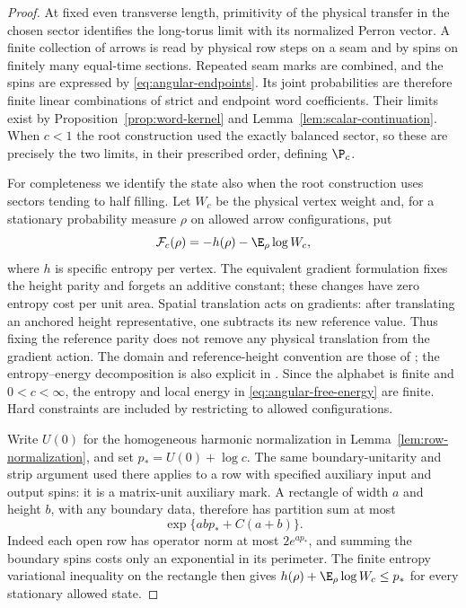 \begin{proof}
At fixed even transverse length, primitivity of the physical transfer
in the chosen sector identifies the long-torus limit with its normalized
Perron vector.  A finite collection of arrows is read by physical row
steps on a seam and by spins on finitely many equal-time sections.
Repeated seam marks are combined, and the spins are expressed by
\eqref{eq:angular-endpoints}.  Its joint probabilities are therefore
finite linear combinations of strict and endpoint word coefficients.
Their limits exist by Proposition~\ref{prop:word-kernel} and
Lemma~\ref{lem:scalar-continuation}.  When $c<1$ the root construction
used the exactly balanced sector, so these are precisely the two limits,
in their prescribed order, defining $\P_c$.

For completeness we identify the state also when the root construction
uses sectors tending to half filling.  Let $W_c$ be the physical vertex
weight and, for a stationary probability measure $\rho$ on allowed
arrow configurations, put
\begin{equation}\label{eq:angular-free-energy}
 \mathcal F_c(\rho)=-h(\rho)-\E_\rho\log W_c,
\end{equation}
where $h$ is specific entropy per vertex.  The equivalent gradient
formulation fixes the height parity and forgets an additive constant;
these changes have zero entropy cost per unit area.  Spatial translation
acts on gradients: after translating an anchored height representative,
one subtracts its new reference value.  Thus fixing the reference parity
does not remove any physical translation from the gradient action.
The domain and reference-height convention are those of
\cite[Section 2.3 and Appendix B]{Sheffield2005}; the entropy--energy
decomposition is also explicit in
\cite[Sections 2.3.2--2.3.4]{LammersTassy2024}.
Since the alphabet
is finite and $0<c<\infty$, the entropy and local energy in
\eqref{eq:angular-free-energy} are finite.  Hard constraints are included
by restricting to allowed configurations.

Write $U(0)$ for the homogeneous harmonic normalization in
Lemma~\ref{lem:row-normalization}, and set
$p_*=U(0)+\log c$.  The same boundary-unitarity and strip argument used
there applies to a row with specified auxiliary input and output spins:
it is a matrix-unit auxiliary mark.  A rectangle of width $a$ and
height $b$, with any boundary data, therefore has partition sum at most
\[
 \exp\{abp_*+C(a+b)\}.
\]
Indeed each open row has operator norm at most $2e^{ap_*}$, and
summing the boundary spins costs only an exponential in its perimeter.
The finite entropy variational inequality on the rectangle then gives
$h(\rho)+\E_\rho\log W_c\le p_*$ for every stationary allowed state.


\end{proof}
